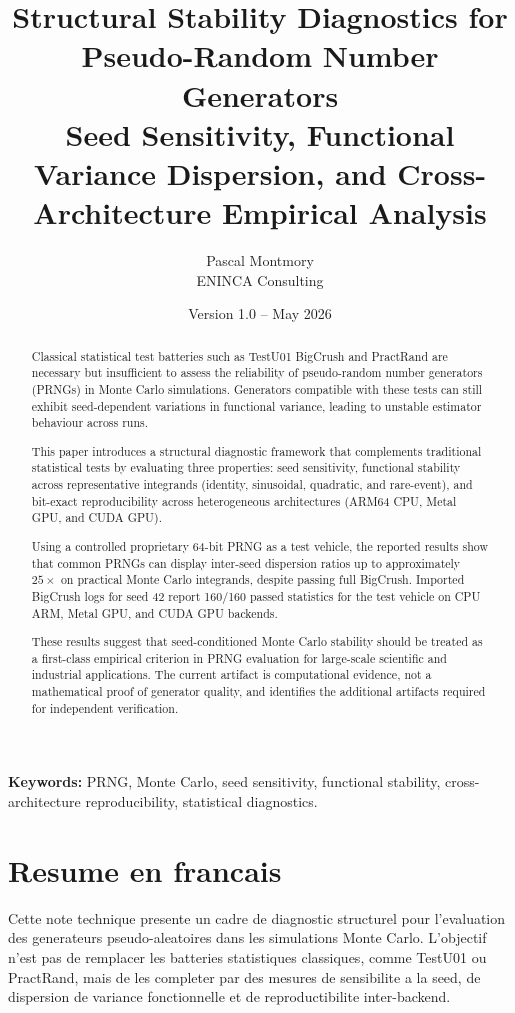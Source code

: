 \documentclass[11pt,a4paper]{article}
\title{\textbf{Structural Stability Diagnostics for Pseudo-Random Number Generators}\\
\large Seed Sensitivity, Functional Variance Dispersion, and Cross-Architecture Empirical Analysis}
\author{Pascal Montmory\\
ENINCA Consulting}
\date{Version 1.0 -- May 2026}
\begin{document}
\maketitle

\begin{abstract}
Classical statistical test batteries such as TestU01 BigCrush and PractRand are necessary but insufficient to assess the reliability of pseudo-random number generators (PRNGs) in Monte Carlo simulations. Generators compatible with these tests can still exhibit seed-dependent variations in functional variance, leading to unstable estimator behaviour across runs.

This paper introduces a structural diagnostic framework that complements traditional statistical tests by evaluating three properties: seed sensitivity, functional stability across representative integrands (identity, sinusoidal, quadratic, and rare-event), and bit-exact reproducibility across heterogeneous architectures (ARM64 CPU, Metal GPU, and CUDA GPU).

Using a controlled proprietary 64-bit PRNG as a test vehicle, the reported results show that common PRNGs can display inter-seed dispersion ratios up to approximately $25\times$ on practical Monte Carlo integrands, despite passing full BigCrush. Imported BigCrush logs for seed 42 report 160/160 passed statistics for the test vehicle on CPU ARM, Metal GPU, and CUDA GPU backends.

These results suggest that seed-conditioned Monte Carlo stability should be treated as a first-class empirical criterion in PRNG evaluation for large-scale scientific and industrial applications. The current artifact is computational evidence, not a mathematical proof of generator quality, and identifies the additional artifacts required for independent verification.
\end{abstract}

\noindent\textbf{Keywords:} PRNG, Monte Carlo, seed sensitivity, functional stability, cross-architecture reproducibility, statistical diagnostics.

\section*{Resume en francais}

Cette note technique presente un cadre de diagnostic structurel pour l'evaluation des generateurs pseudo-aleatoires dans les simulations Monte Carlo. L'objectif n'est pas de remplacer les batteries statistiques classiques, comme TestU01 ou PractRand, mais de les completer par des mesures de sensibilite a la seed, de dispersion de variance fonctionnelle et de reproductibilite inter-backend.
\end{document}
